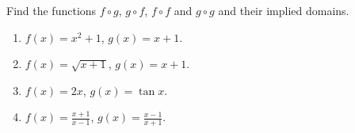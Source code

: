 Find the functions $f\circ g$, $g\circ f$, $f\circ f$ and $g\circ g$ and their implied domains.

\begin{enumerate}
\item $f(x)=x^2+1$, $g(x)=x+1$. 
\item $f(x)=\sqrt{x+1}$, $g(x)=x+1$. 
\item $f(x)= 2x$, $g(x)= \tan x$.
\item $f(x)=\frac{x+1}{x-1}$, $g(x)=\frac{x-1}{x+1}$.
\end{enumerate}

